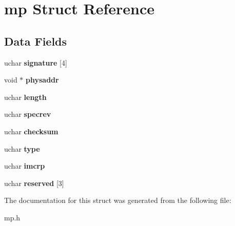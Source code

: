 \hypertarget{structmp}{}\section{mp Struct Reference}
\label{structmp}
\subsection*{Data Fields}
\begin{DoxyCompactItemize}
\item 
\mbox{\label{structmp_af2bfc400b8e6edae4c0e6ff437a2a1f4}} 
uchar {\bfseries signature} \mbox{[}4\mbox{]}
\item 
\mbox{\label{structmp_a3333bff25a42470efb69b3b01f08d6ce}} 
void $\ast$ {\bfseries physaddr}
\item 
\mbox{\label{structmp_a46a03e7ef27f7290a5fb49bcb4c3c507}} 
uchar {\bfseries length}
\item 
\mbox{\label{structmp_a0be99b736e3c6fb1f405944868674063}} 
uchar {\bfseries specrev}
\item 
\mbox{\label{structmp_a0d403ddb2898b8cadf31f9f75d31163a}} 
uchar {\bfseries checksum}
\item 
\mbox{\label{structmp_a08cf79f94b4dcfce588ccb41f90cbe0e}} 
uchar {\bfseries type}
\item 
\mbox{\label{structmp_ae2157bc407a7423c57bdb078b70cd6e5}} 
uchar {\bfseries imcrp}
\item 
\mbox{\label{structmp_a7a87ebdff0db6123f294d93ee98c42ab}} 
uchar {\bfseries reserved} \mbox{[}3\mbox{]}
\end{DoxyCompactItemize}


The documentation for this struct was generated from the following file\+:\begin{DoxyCompactItemize}
\item 
mp.\+h\end{DoxyCompactItemize}
